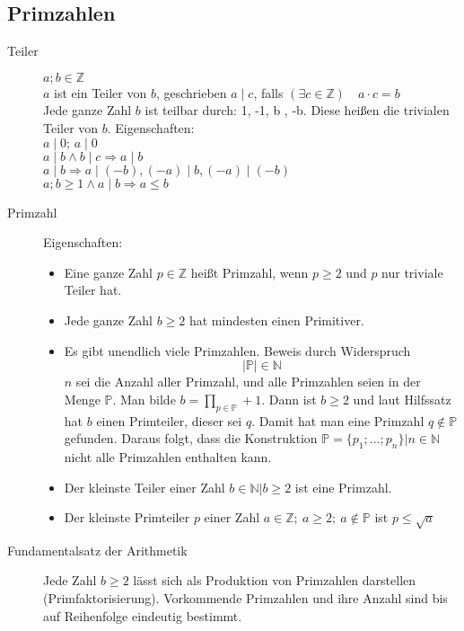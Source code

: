 \documentclass[12pt,a4paper]{article}
\begin{document}
\subsection{Primzahlen}
\begin{description}
	\item[Teiler] $a;b \in \mathbb{Z}$\\
		$a$ ist ein Teiler von $b$, geschrieben $a \mid c$, falls $(\exists c \in \mathbb{Z})\quad a \cdot c = b$\\
		Jede ganze Zahl $b$ ist teilbar durch: 1, -1, b , -b. Diese heißen die trivialen Teiler von $b$. Eigenschaften: \\
		$a \mid 0;\, a \mid 0$ \\
		$a \mid b \wedge b \mid c \Rightarrow a \mid b$ \\
		$a \mid b \Rightarrow a \mid (-b), (-a) \mid b, (-a) \mid (-b)$ \\
		$a;b \geq 1 \wedge a \mid b \Rightarrow a \leq b$
	\item[Primzahl] Eigenschaften:
		\begin{itemize}
			\item Eine ganze Zahl $p \in \mathbb{Z}$ heißt Primzahl, wenn $p \geq 2$ und $p$ nur triviale Teiler hat.
			\item Jede ganze Zahl $b \geq 2$ hat mindesten einen Primitiver.
			\item Es gibt unendlich viele Primzahlen. Beweis durch Widerspruch
			      $$|\mathbb{P}| \in \mathbb{N}$$
			      $n$ sei die Anzahl aller Primzahl, und alle Primzahlen seien in der Menge $\mathbb{P}$. Man bilde $b = \prod\limits_{p \in \mathbb{ P}} + 1$. Dann ist $b \geq 2$ und laut Hilfssatz hat $b$ einen Primteiler, dieser sei $q$. Damit hat man eine Primzahl $q \not \in \mathbb{P}$ gefunden. Daraus folgt, dass die Konstruktion $\mathbb{P} = \lbrace p_1; \dots; p_n \rbrace | n \in \mathbb{N}$ nicht alle Primzahlen enthalten kann.
			\item Der kleinste Teiler einer Zahl $b \in \mathbb{N}|b \geq 2$ ist eine Primzahl.
			\item Der kleinste Primteiler $p$ einer Zahl $a \in \mathbb{Z};\ a \geq 2;\ a \not \in \mathbb{P}$ ist $p \leq \sqrt{a}$
		\end{itemize}
	\item[Fundamentalsatz der Arithmetik] Jede Zahl $b \geq 2$ lässt sich als Produktion von Primzahlen darstellen (Primfaktorisierung). Vorkommende Primzahlen und ihre Anzahl sind bis auf Reihenfolge eindeutig bestimmt.
\end{description}
\end{document}
